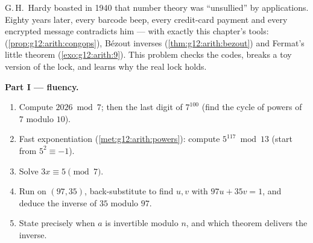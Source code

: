 \begin{problem}
\label{pb:g12:arith:1}
G.\,H.~Hardy boasted in 1940 that number theory was ``unsullied''
by applications. Eighty years later, every barcode beep, every
credit-card payment and every encrypted message contradicts him
--- with exactly this chapter's tools: 
(\cref{prop:g12:arith:congops}), B\'ezout inverses
(\cref{thm:g12:arith:bezout}) and Fermat's little theorem
(\cref{exo:g12:arith:9}). This problem checks the codes, breaks a
toy version of the lock, and learns why the real lock holds.

\medskip
\noindent\textbf{Part I ---  fluency.}
\begin{enumerate}
  \item Compute $2026 \bmod 7$; then the last digit of
        $7^{100}$ (find the cycle of powers of $7$ modulo
        $10$).
  \item Fast exponentiation (\cref{met:g12:arith:powers}):
        compute $5^{117} \bmod 13$ (start from
        $5^2 \equiv -1$).
  \item Solve $3x \equiv 5 \pmod 7$.
  \item Run  on $(97, 35)$, back-substitute
        to find  $u, v$ with $97u + 35v = 1$, and
        deduce the inverse of $35$ modulo $97$.
  \item State precisely when $a$ is invertible modulo $n$, and
        which theorem delivers the inverse.
\end{enumerate}


\end{problem}
